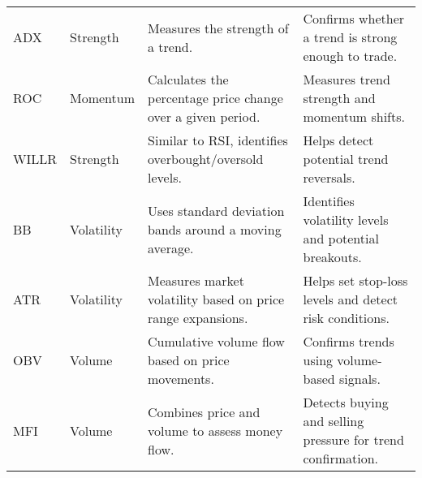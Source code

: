 \begin{longtable}{llp{5cm}p{5cm}}
        ADX & Strength 
        & Measures the strength of a trend. 
        & Confirms whether a trend is strong enough to trade. \\
        ROC & Momentum 
        & Calculates the percentage price change over a given period. 
        & Measures trend strength and momentum shifts. \\
        WILLR & Strength
        & Similar to RSI, identifies overbought/oversold levels. 
        & Helps detect potential trend reversals. \\
        BB & Volatility 
        & Uses standard deviation bands around a moving average. 
        & Identifies volatility levels and potential breakouts. \\
        ATR & Volatility 
        & Measures market volatility based on price range expansions. 
        & Helps set stop-loss levels and detect risk conditions. \\
        OBV & Volume 
        & Cumulative volume flow based on price movements. 
        & Confirms trends using volume-based signals. \\
        MFI & Volume
        & Combines price and volume to assess money flow. 
        & Detects buying and selling pressure for trend confirmation. \\
        \hline
\end{longtable}

